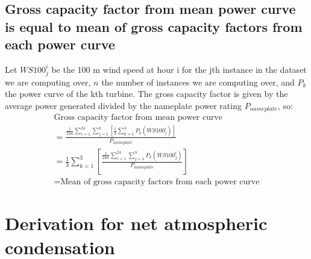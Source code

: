 \subsection{Gross capacity factor from mean power curve is equal to mean of gross capacity factors from each power curve}

Let $WS100^i_j$ be the 100 m wind speed at hour i for the jth instance in the dataset we are computing over, $n$ the number of instances we are computing over, and $P_k$ the power curve of the kth turbine. The gross capacity factor is given by the average power generated divided by the nameplate power rating $P_{nameplate}$, so:
\begin{eqnarray}
	\mbox{Gross capacity factor from mean power curve} \\
	= \frac{\frac{1}{24n} \sum_{i=1}^{24} \sum_{j=1}^{n} \left[\frac{1}{3} \sum_{k=1}^{3} P_k (WS100^i_j) \right]}{P_{nameplate}} \nonumber \\
	= \frac{1}{3} \sum_{k=1}^{3} \left[ \frac{\frac{1}{24n} \sum_{i=1}^{24} \sum_{j=1}^{n} P_k (WS100^i_j)}{P_{nameplate}} \right] \nonumber \\
	= \mbox{Mean of gross capacity factors from each power curve} \nonumber
\end{eqnarray}

\section{Derivation for net atmospheric condensation}
\label{sec:nac_derive}

